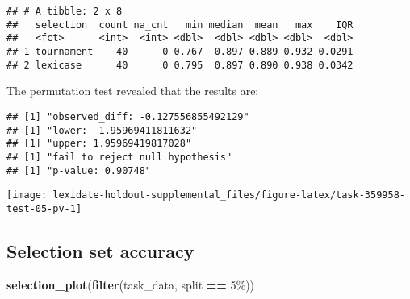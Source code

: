 \documentclass[
]{book}
\newenvironment{Shaded}{\begin{snugshade}}{\end{snugshade}}
\newcommand{\AttributeTok}[1]{\textcolor[rgb]{0.13,0.29,0.53}{#1}}
\newcommand{\DecValTok}[1]{\textcolor[rgb]{0.00,0.00,0.81}{#1}}
\newcommand{\FunctionTok}[1]{\textcolor[rgb]{0.13,0.29,0.53}{\textbf{#1}}}
\newcommand{\NormalTok}[1]{#1}
\newcommand{\OtherTok}[1]{\textcolor[rgb]{0.56,0.35,0.01}{#1}}
\newcommand{\SpecialCharTok}[1]{\textcolor[rgb]{0.81,0.36,0.00}{\textbf{#1}}}
\newcommand{\StringTok}[1]{\textcolor[rgb]{0.31,0.60,0.02}{#1}}
\begin{document}
\begin{verbatim}
## # A tibble: 2 x 8
##   selection  count na_cnt   min median  mean   max    IQR
##   <fct>      <int>  <int> <dbl>  <dbl> <dbl> <dbl>  <dbl>
## 1 tournament    40      0 0.767  0.897 0.889 0.932 0.0291
## 2 lexicase      40      0 0.795  0.897 0.890 0.938 0.0342
\end{verbatim}

The permutation test revealed that the results are:

\begin{Shaded}
\end{Shaded}

\begin{verbatim}
## [1] "observed_diff: -0.127556855492129"
## [1] "lower: -1.95969411811632"
## [1] "upper: 1.95969419817028"
## [1] "fail to reject null hypothesis"
## [1] "p-value: 0.90748"
\end{verbatim}

\texttt{[image: lexidate-holdout-supplemental\_files/figure-latex/task-359958-test-05-pv-1]}

\hypertarget{selection-set-accuracy-30}{%
\subsection{Selection set accuracy}\label{selection-set-accuracy-30}}

\begin{Shaded}
\begin{Highlighting}[]
\FunctionTok{selection\_plot}\NormalTok{(}\FunctionTok{filter}\NormalTok{(task\_data, split }\SpecialCharTok{==} \StringTok{\textquotesingle{}5\%\textquotesingle{}}\NormalTok{))}
\end{Highlighting}
\end{Shaded}
\end{document}
